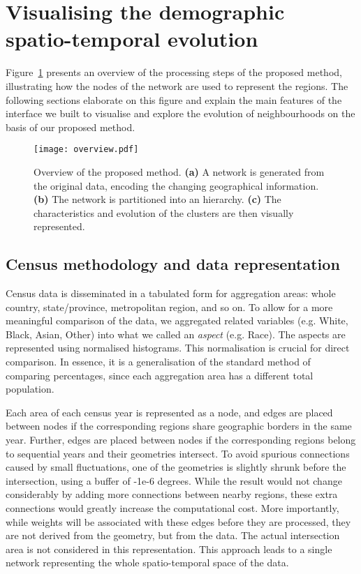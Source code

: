 \section{Visualising the demographic spatio-temporal evolution}
\label{sec:method}
Figure~\ref{fig:overview} presents an overview of the processing steps of the
proposed method, illustrating how the nodes of the network are used to represent
the regions. The following sections elaborate on this figure and explain the
main features of the interface we built to visualise and explore the evolution
of neighbourhoods on the basis of our proposed method.


\begin{figure}
    \centering 
    \texttt{[image: overview.pdf]}
    \caption{Overview of the proposed method. 
        \textbf{(a)} A network is generated from the original data,
        encoding the changing geographical information. 
        \textbf{(b)} The network is partitioned into an hierarchy. 
        \textbf{(c)} The characteristics and evolution of the clusters are then
        visually represented.
        \label{fig:overview}}
\end{figure}


\subsection{Census methodology and data representation}

Census data is disseminated in a tabulated form for aggregation areas: whole
country, state/province, metropolitan region, and so on. To allow for a more
meaningful comparison of the data, we aggregated related variables (e.g. White,
Black, Asian, Other) into what we called an \emph{aspect} (e.g. Race). The
aspects are represented using normalised histograms. This normalisation is
crucial for direct comparison. In essence, it is a generalisation of the
standard method of comparing percentages, since each aggregation area has a
different total population.

Each area of each census year is represented as a node, and edges are placed
between nodes if the corresponding regions share geographic borders in the same
year. Further, edges are placed between nodes if the corresponding regions
belong to sequential years and their geometries intersect.
To avoid spurious connections caused by small fluctuations, one of the
geometries is slightly shrunk before the intersection, using a buffer of -1e-6
degrees. While the result would not change considerably by adding more
connections between nearby regions, these extra connections would greatly
increase the computational cost. More importantly, while weights will be
associated with these edges before they are processed, they are not derived from
the geometry, but from the data. The actual intersection area is not considered
in this representation.  This approach leads to a single network representing
the whole spatio-temporal space of the data. 


